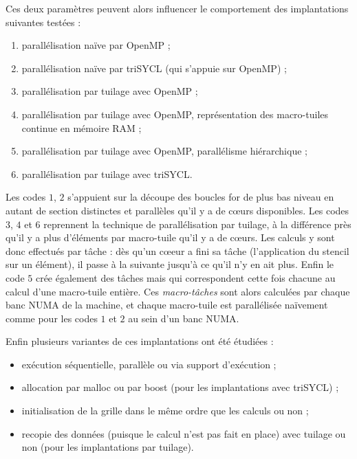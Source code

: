 Ces deux paramètres peuvent alors influencer le comportement des implantations suivantes testées :
\begin{enumerate}
\item parallélisation naïve par \textsf{OpenMP} ;
\item parallélisation naïve par \textsf{triSYCL} (qui s'appuie sur \textsf{OpenMP}) ;
\item parallélisation par tuilage avec \textsf{OpenMP} ;
\item parallélisation par tuilage avec \textsf{OpenMP}, représentation des macro-tuiles continue en mémoire RAM ;
\item parallélisation par tuilage avec \textsf{OpenMP}, parallélisme hiérarchique ;
\item parallélisation par tuilage avec \textsf{triSYCL}.
\end{enumerate}
Les codes $1$, $2$ s'appuient sur la découpe des boucles \textsf{for} de plus bas niveau en autant de section distinctes et parallèles qu'il y a de cœurs disponibles. Les codes $3$, $4$ et $6$ reprennent la technique de parallélisation par tuilage, à la différence près qu'il y a plus d'éléments par macro-tuile qu'il y a de cœurs. Les calculs y sont donc effectués par tâche : dès qu'un cœeur a fini sa tâche (l'application du stencil sur un élément), il passe à la suivante jusqu'à ce qu'il n'y en ait plus. Enfin le code $5$ crée également des tâches mais qui correspondent cette fois chacune au calcul d'une macro-tuile entière. Ces \emph{macro-tâches} sont alors calculées par chaque banc NUMA de la machine, et chaque macro-tuile est parallélisée naïvement comme pour les codes $1$ et $2$ au sein d'un banc NUMA.

Enfin plusieurs variantes de ces implantations ont été étudiées :
\begin{itemize}
\item exécution séquentielle, parallèle ou via support d'exécution ;
\item allocation par \textsf{malloc} ou par \textsf{boost} (pour les implantations avec \textsf{triSYCL}) ;
\item initialisation de la grille dans le même ordre que les calculs ou non ;
\item recopie des données (puisque le calcul n'est pas fait en place) avec tuilage ou non (pour les implantations par tuilage).
\end{itemize}

